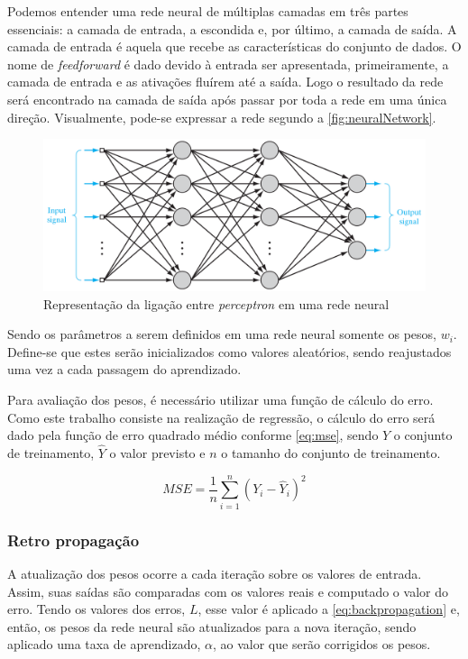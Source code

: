 \documentclass[
    12pt,
    oneside,
    a4paper,
    english,
    brazil
]{abntex2}
\begin{document}
Podemos  entender  uma  rede  neural   de  múltiplas  camadas  em  três  partes
essenciais: a camada de entrada, a escondida  e, por último, a camada de saída.
A  camada de  entrada é  aquela que  recebe as  características do  conjunto de
dados. O nome de \textit{feedforward} é  dado devido à entrada ser apresentada,
primeiramente, a camada de  entrada e as ativações fluírem até  a saída. Logo o
resultado da  rede será encontrado  na camada de saída  após passar por  toda a
rede em  uma única  direção. Visualmente,  pode-se expressar  a rede  segundo a
\autoref{fig:neuralNetwork}.

\begin{figure}[ht]
    \centering
    \caption{Representação da ligação entre \textit{perceptron} em uma rede
    neural}\label{fig:neuralNetwork}
    \includegraphics[width=.5\linewidth]{images/neuralNetwork.png}
\end{figure}

Sendo os  parâmetros a  serem definidos  em uma rede  neural somente  os pesos,
$w_i$. Define-se que  estes serão inicializados como  valores aleatórios, sendo
reajustados uma vez a cada passagem do aprendizado.

Para avaliação dos pesos, é necessário  utilizar uma função de cálculo do erro.
Como este trabalho consiste na realização  de regressão, o cálculo do erro será
dado pela função de erro quadrado  médio conforme \autoref{eq:mse}, sendo $Y$ o
conjunto de treinamento, $\hat{Y}$ o valor previsto e $n$ o tamanho do conjunto
de treinamento.

\begin{equation}\label{eq:mse}
    MSE = \frac{1}{n}\sum_{i=1}^{n}{{(Y_i - \hat{Y}_i)}^2}
\end{equation}

\subsubsection{Retro propagação}

A atualização  dos pesos ocorre  a cada iteração  sobre os valores  de entrada.
Assim,  suas  saídas  são  comparadas  com  os  valores  reais  e  computado  o
valor  do erro.  Tendo os  valores  dos erros,  $L$,  esse valor  é aplicado  a
\autoref{eq:backpropagation} e, então, os pesos  da rede neural são atualizados
para a  nova iteração,  sendo aplicado  uma taxa  de aprendizado,  $\alpha$, ao
valor que serão corrigidos os pesos.
\end{document}
